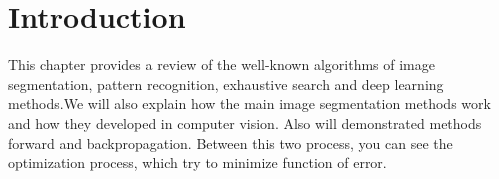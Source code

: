 
\section{Introduction}\label{sec:3.1}
\vspace{-0.5cm}
\noindent This chapter provides a review of the well-known algorithms of image segmentation, pattern recognition, exhaustive search and deep learning methods.We will also explain how the main image segmentation methods work and how they developed in computer vision. Also will demonstrated methods forward and backpropagation. Between this two process, you can see the optimization process, which try to minimize function of error. 

\vspace{-0.3cm}




